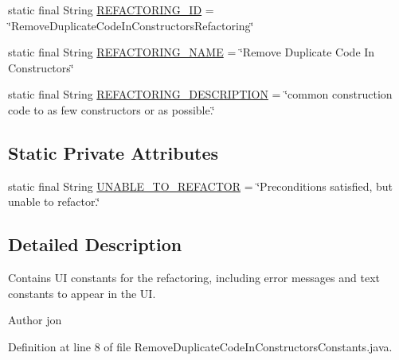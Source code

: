 \begin{DoxyCompactItemize}
\item 
static final String \hyperlink{classedu_1_1illinois_1_1canistelCassabanana_1_1RemoveDuplicateCodeInConstructorsConstants_a9ec775251440faa08c5106486ba0cfee}{REFACTORING\_\-ID} = \char`\"{}RemoveDuplicateCodeInConstructorsRefactoring\char`\"{}
\item 
static final String \hyperlink{classedu_1_1illinois_1_1canistelCassabanana_1_1RemoveDuplicateCodeInConstructorsConstants_a6731b6d50436db4f3f9a0ecb1ba760fe}{REFACTORING\_\-NAME} = \char`\"{}Remove Duplicate Code In Constructors\char`\"{}
\item 
static final String \hyperlink{classedu_1_1illinois_1_1canistelCassabanana_1_1RemoveDuplicateCodeInConstructorsConstants_abc82ec73939a90527fd8d564f097cef2}{REFACTORING\_\-DESCRIPTION} = \char`\"{}common construction code to as few constructors or as possible.\char`\"{}
\end{DoxyCompactItemize}
\subsection*{Static Private Attributes}
\begin{DoxyCompactItemize}
\item 
static final String \hyperlink{classedu_1_1illinois_1_1canistelCassabanana_1_1RemoveDuplicateCodeInConstructorsConstants_af6677744b84dd45adf12fd7b89ed48ac}{UNABLE\_\-TO\_\-REFACTOR} = \char`\"{}Preconditions satisfied, but unable to refactor.\char`\"{}
\end{DoxyCompactItemize}


\subsection{Detailed Description}
Contains UI constants for the refactoring, including error messages and text constants to appear in the UI.

\begin{DoxyAuthor}{Author}
jon 
\end{DoxyAuthor}


Definition at line 8 of file RemoveDuplicateCodeInConstructorsConstants.java.



